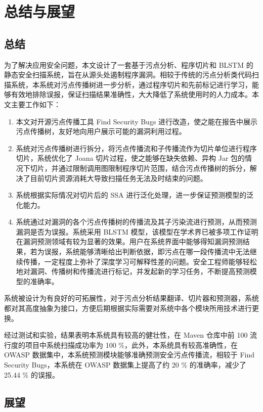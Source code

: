 \chapter{总结与展望}
\section{总结}
为了解决应用安全问题，本文设计了一套基于污点分析、程序切片和 BLSTM 的静态安全扫描系统，旨在从源头处遏制程序漏洞。相较于传统的污点分析类代码扫描系统，本系统对污点传播树进一步分析，通过程序切片和先前标记进行学习，能够有效地排除误报，保证扫描结果准确性，大大降低了系统使用时的人力成本。本文主要工作如下：


\begin{enumerate}
    \item 本文对开源污点传播工具 Find Security Bugs 进行改造，使之能在报告中展示污点传播树，友好地向用户展示可能的漏洞利用过程。
    \item 系统对污点传播树进行拆分，将污点传播流和子传播流作为切片单位进行程序切片，系统优化了 Joana 切片过程，使之能够在缺失依赖、异构 Jar 包的情况下切片，并通过限制调用图限制程序切片范围，结合污点传播树的拆分，解决了目前切片资源消耗大导致扫描任务无法及时结束的问题。
    \item 系统根据实际情况对切片后的 SSA 进行泛化处理，进一步保证预测模型的泛化能力。
    \item 系统通过对漏洞的各个污点传播树的传播流及其子污染流进行预测，从而预测漏洞是否为误报。系统采用 BLSTM 模型，该模型在学术界已被多项工作证明在漏洞预测领域有较为显著的效果。用户在系统界面中能够得知漏洞预测结果，若为误报，系统能够清晰给出判断依据，即污点在哪一段传播流中无法继续传播，一定程度上弥补了深度学习可解释性差的问题。安全工程师能够轻松地对漏洞、传播树和传播流进行标记，并发起新的学习任务，不断提高预测模型的准确率。
\end{enumerate}

系统被设计为有良好的可拓展性，对于污点分析结果翻译、切片器和预测器，系统都对其高度抽象为接口，方便后期根据实际需要对系统中各个模块所用技术进行更换。

经过测试和实验，结果表明本系统具有较高的健壮性，在 Maven 仓库中前 100 流行度的项目中系统扫描成功率为 100 \%，此外，本系统具有较高准确性，在 OWASP 数据集中，本系统预测模块能够准确预测安全污点传播流，相较于 Find Security Bugs，本系统在 OWASP 数据集上提高了约 20 \% 的准确率，减少了 25.44 \% 的误报。

\section{展望}

